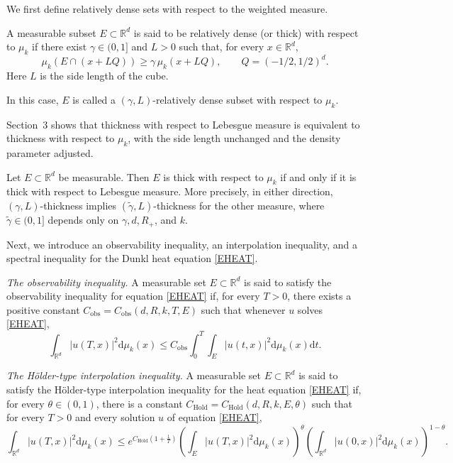 \documentclass[12pt]{article}
\begin{document}
We first define relatively dense sets with respect to the weighted measure.
\begin{definition}\label{D1}
A measurable subset $E\subset\mathbb{R}^d$ is said to be relatively dense (or thick) with respect to $\mu_k$ if there exist $\gamma\in(0,1]$ and $L>0$ such that, for every $x\in\mathbb{R}^d$,
\begin{equation}
\mu_k(E\cap(x+LQ))\ge\gamma\,\mu_k(x+LQ),
\qquad Q=(-1/2,1/2)^d.
\end{equation}
Here $L$ is the side length of the cube.

In this case, $E$ is called a $(\gamma,L)$-relatively dense subset with respect to $\mu_k$.
\end{definition}
Section~3 shows that thickness with respect to Lebesgue measure is equivalent to thickness with respect to $\mu_k$, with the side length unchanged and the density parameter adjusted.
\begin{theorem}\label{TEV}
Let $E\subset\mathbb{R}^d$ be measurable. Then $E$ is thick with respect to $\mu_k$ if and only if it is thick with respect to Lebesgue measure. More precisely, in either direction, $(\gamma,L)$-thickness implies $(\widetilde\gamma,L)$-thickness for the other measure, where $\widetilde\gamma\in(0,1]$ depends only on $\gamma,d,R_+$, and $k$.
\end{theorem}

Next, we introduce an observability inequality, an interpolation inequality, and a spectral inequality for the Dunkl heat equation \eqref{EHEAT}.

\emph{The observability inequality.} A measurable set $E \subset \mathbb{R}^d$ is said to satisfy the observability inequality for equation \eqref{EHEAT} if, for every $T > 0$, there exists a positive constant $C_{\mathrm{obs}} = C_{\mathrm{obs}}(d,R,k,T,E)$ such that whenever $u$ solves \eqref{EHEAT},
\begin{equation}\label{EOBS}
\int_{\mathbb{R}^d} |u(T, x)|^2 \mathrm{d}\mu_k(x) \le C_{\mathrm{obs}} \int_{0}^{T} \int_{E} |u(t, x)|^2 \mathrm{d}\mu_k(x) \mathrm{d}t.
\end{equation}

\emph{The H\"older-type interpolation inequality.} A measurable set $E \subset \mathbb{R}^d$ is said to satisfy the H\"older-type interpolation inequality for the heat equation \eqref{EHEAT} if, for every $\theta \in (0,1)$, there is a constant $C_{\mathrm{Hold}} = C_{\mathrm{Hold}}(d,R,k,E,\theta)$ such that for every $T > 0$ and every solution $u$ of equation \eqref{EHEAT},
\begin{equation}\label{EHOLDER}
\int_{\mathbb{R}^d} |u(T, x)|^2 \mathrm{d}\mu_k(x)
\le e^{C_{\mathrm{Hold}}\left(1+\frac{1}{T}\right)}
\left( \int_{E} |u(T, x)|^2 \mathrm{d}\mu_k(x) \right)^{\theta}
\left( \int_{\mathbb{R}^d} |u(0, x)|^2 \mathrm{d}\mu_k(x) \right)^{1-\theta}.
\end{equation}
\end{document}
